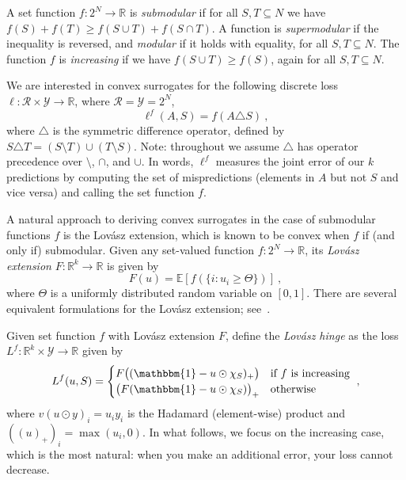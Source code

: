 \documentclass[11pt]{article}
\newcommand{\Comments}{1}
\newcommand{\mytodo}[2]{\ifnum\Comments=1%
  \todo[linecolor=#1!80!black,backgroundcolor=#1,bordercolor=#1!80!black]{#2}\fi}
\newcommand{\jessiet}[1]{\mytodo{teal!20!white}{JF: #1}}
\newcommand{\reals}{\mathbb{R}}
\newcommand{\E}{\mathbb{E}}
\newcommand{\R}{\mathcal{R}}
\newcommand{\Y}{\mathcal{Y}}
\newcommand{\ones}{\mathbbm{1}}
\begin{document}
A set function $f:2^N\to\reals$ is \emph{submodular} if for all $S,T\subseteq N$ we have $f(S) + f(T) \geq f(S\cup T) + f(S\cap T)$.
A function is \emph{supermodular} if the inequality is reversed, and \emph{modular} if it holds with equality, for all $S,T\subseteq N$.
The function $f$ is \emph{increasing} if we have $f(S\cup T) \geq f(S)$, again for all $S,T\subseteq N$.

We are interested in convex surrogates for the following discrete loss $\ell:\R\times\Y\to\reals$, where $\R=\Y=2^N$,
\begin{equation}
\label{eq:discrete-set-loss}
\ell^f(A,S) = f(A\triangle S)~,
\end{equation}
where $\triangle$ is the symmetric difference operator, defined by $S\triangle T = (S\setminus T) \cup (T\setminus S)$.
Note: throughout we assume $\triangle$ has operator precedence over $\setminus$, $\cap$, and $\cup$.
In words, $\ell^f$ measures the joint error of our $k$ predictions by computing the set of mispredictions (elements in $A$ but not $S$ and vice versa) and calling the set function $f$.

A natural approach to deriving convex surrogates in the case of submodular functions $f$ is the Lov\'asz extension, which is known to be convex when $f$ if (and only if) submodular. %
Given any set-valued function $f:2^N\to\reals$, its \emph{Lov\'asz extension} $F:\reals^k\to\reals$ is given by
\begin{equation}\label{eq:lovasz-ext}
F(u) = \E[f(\{i:u_i \geq \Theta\})]~,
\end{equation}
where $\Theta$ is a uniformly distributed random variable on $[0,1]$.
There are several equivalent formulations for the Lov\'asz extension; see~\citet[Definition 3.1]{bach2013learning}.

Given set function $f$ with Lov\'asz extension $F$, \citet{yu2018lovasz} define the \emph{Lov\'asz hinge} as the loss $L^f:\reals^k\times\Y\to\reals$ given by
\begin{equation}
\label{eq:lovasz-hinge}
L^f(u,S) =
\begin{cases}
F\bigl((\ones - u \odot \chi_S)_+\bigr) & \text{if $f$ is increasing}
\\
\bigl(F(\ones - u \odot \chi_S)\bigr)_+ & \text{otherwise}
\end{cases}~,
\end{equation}
where $v (u \odot y)_i = u_iy_i$ is the Hadamard (element-wise) product and $((u)_+)_i = \max(u_i,0)$.
In what follows, we focus on the increasing case, which is the most natural: when you make an additional error, your loss cannot decrease.
\end{document}
